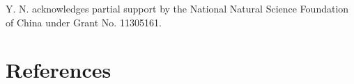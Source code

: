 \documentclass[12pt,a4paper,final]{iopart}
\begin{document}
\ack
Y. N. acknowledges partial support by the National Natural Science Foundation of China under Grant No. 11305161.

\section*{References}


\end{document}
